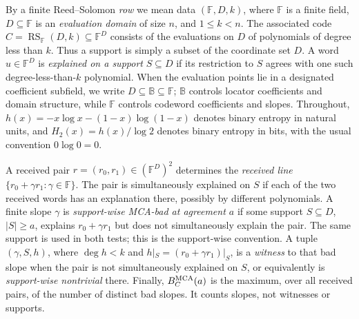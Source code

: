 \documentclass[12pt,a4paper]{amsart}
\numberwithin{equation}{section}
\theoremstyle{remark}
\DeclareMathOperator{\RS}{RS}
\newcommand{\F}{\mathbb F}
\newcommand{\B}{\mathbb B}
\newcommand{\abs}[1]{\lvert #1\rvert}
\begin{document}
By a finite Reed--Solomon \emph{row} we mean data
\((\F,D,k)\), where \(\F\) is a finite field,
\(D\subseteq\F\) is an \emph{evaluation domain} of size \(n\), and
\(1\le k<n\).  The associated code
\(C=\RS_\F(D,k)\subseteq\F^D\) consists of the evaluations on \(D\) of
polynomials of degree less than \(k\).  Thus a support is simply a subset
of the coordinate set \(D\).  A word \(u\in\F^D\) is
\emph{explained on a support} \(S\subseteq D\) if its restriction to
\(S\) agrees with one such degree-less-than-\(k\) polynomial.
When the evaluation points lie in a designated coefficient subfield, we
write \(D\subseteq\B\subseteq\F\); \(\B\) controls locator coefficients
and domain structure, while \(\F\) controls codeword coefficients and
slopes.
Throughout,
\(h(x)=-x\log x-(1-x)\log(1-x)\) denotes binary entropy in natural
units, and \(H_2(x)=h(x)/\log 2\) denotes binary entropy in bits, with the
usual convention \(0\log0=0\).

A received pair \(r=(r_0,r_1)\in(\F^D)^2\) determines the
\emph{received line} \(\{r_0+\gamma r_1:\gamma\in\F\}\).  The pair is
simultaneously explained on \(S\) if each of the two received words has an explanation
there, possibly by different polynomials.  A finite slope \(\gamma\) is
\emph{support-wise MCA-bad at agreement \(a\)} if some support
\(S\subseteq D\), \(\abs S\ge a\), explains
\(r_0+\gamma r_1\) but does not simultaneously explain the pair.  The
same support is used in both tests; this is the support-wise convention.
A tuple \((\gamma,S,h)\), where \(\deg h<k\) and
\(h|_S=(r_0+\gamma r_1)|_S\), is a \emph{witness} to that bad slope when
the pair is not simultaneously explained on \(S\), or equivalently is
\emph{support-wise nontrivial} there.  Finally,
\(B_C^{\rm MCA}(a)\) is the maximum, over all received pairs, of the
number of distinct bad slopes.  It counts slopes, not witnesses or
supports.
\end{document}
